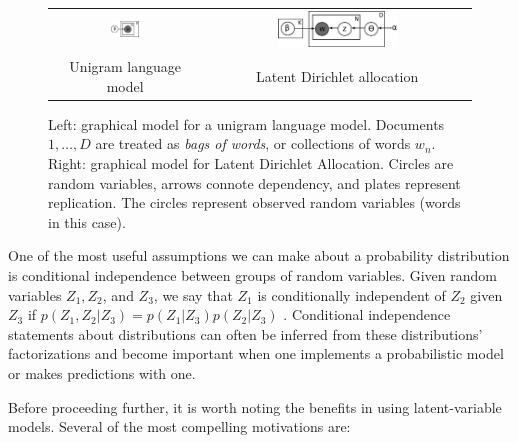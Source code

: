 \begin{figure}
  \begin{center}
    \begin{tabular}{cc}
      \includegraphics[width=0.2\textwidth]{chapter_introductory_material/figs/bagofwords_gm.pdf} & 
      \includegraphics[width=0.4667\textwidth]{chapter_introductory_material/figs/lda_gm.pdf} \\
      Unigram language model & Latent Dirichlet allocation \\
    \end{tabular}
  \end{center}
  \caption{Left: graphical model for a unigram language model.
    Documents $1, \ldots, D$ are treated as \emph{bags of words}, or
    collections of words $w_n$.  Right: graphical model for Latent
    Dirichlet Allocation.  Circles are random variables, arrows
    connote dependency, and plates represent replication.  The circles
    represent observed random variables (words in this case).}
  \label{fig:bagofwords_lda_gm}
\end{figure}

One of the most useful assumptions we can make about a probability
distribution is conditional independence between groups of random
variables.  Given random variables $Z_1, Z_2$, and $Z_3$, we say that
$Z_1$ is conditionally independent of $Z_2$ given $Z_3$ if $p(Z_1, Z_2
| Z_3) = p(Z_1 | Z_3) p(Z_2 | Z_3)$ \cite{bishop:2006}.  Conditional
independence statements about distributions can often be inferred from
these distributions' factorizations \cite{bishop:2006} and become
important when one implements a probabilistic model or makes
predictions with one.

Before proceeding further, it is worth noting the benefits in using
latent-variable models.  Several of the most compelling motivations are:

